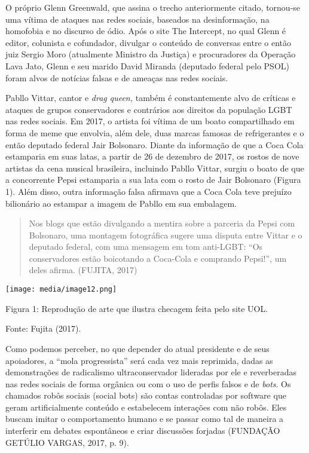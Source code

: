 O próprio Glenn Greenwald, que assina o trecho anteriormente citado,
tornou-se uma vítima de ataques nas redes sociais, baseados na
desinformação, na homofobia e no discurso de ódio. Após o site The
Intercept, no qual Glenn é editor, colunista e cofundador, divulgar o
conteúdo de conversas entre o então juiz Sergio Moro (atualmente
Ministro da Justiça) e procuradores da Operação Lava Jato, Glenn e seu
marido David Miranda (deputado federal pelo PSOL) foram alvos de
notícias falsas e de ameaças nas redes sociais.

Pabllo Vittar, cantor e \emph{drag queen,} também é constantemente alvo
de críticas e ataques de grupos conservadores e contrários aos direitos
da população LGBT nas redes sociais. Em 2017, o artista foi vítima de um
boato compartilhado em forma de meme que envolvia, além dele, duas
marcas famosas de refrigerantes e o então deputado federal Jair
Bolsonaro. Diante da informação de que a Coca Cola estamparia em suas
latas, a partir de 26 de dezembro de 2017, os rostos de nove artistas da
cena musical brasileira, incluindo Pabllo Vittar, surgiu o boato de que
a concorrente Pepsi estamparia a sua lata com o rosto de Jair Bolsonaro
(Figura 1). Além disso, outra informação falsa afirmava que a Coca Cola
teve prejuízo bilionário ao estampar a imagem de Pabllo em sua
embalagem.

\begin{quote}
Nos blogs que estão divulgando a mentira sobre a parceria da Pepsi com
Bolsonaro, uma montagem fotográfica sugere uma disputa entre Vittar e o
deputado federal, com uma mensagem em tom anti-LGBT: ``Os conservadores
estão boicotando a Coca-Cola e comprando Pepsi!'', um deles afirma.
(FUJITA, 2017)
\end{quote}

\texttt{[image: media/image12.png]}

Figura 1: Reprodução de arte que ilustra checagem feita pelo site UOL.

Fonte: Fujita (2017).

Como podemos perceber, no que depender do atual presidente e de seus
apoiadores, a ``mola progressista'' será cada vez mais reprimida, dadas
as demonstrações de radicalismo ultraconservador lideradas por ele e
reverberadas nas redes sociais de forma orgânica ou com o uso de perfis
falsos e de \emph{bots}. Os chamados robôs sociais (social bots) são
contas controladas por software que geram artificialmente conteúdo e
estabelecem interações com não robôs. Eles buscam imitar o comportamento
humano e se passar como tal de maneira a interferir em debates
espontâneos e criar discussões forjadas (FUNDAÇÃO GETÚLIO VARGAS, 2017,
p. 9).

